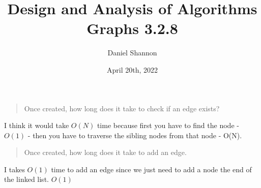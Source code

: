 \documentclass[12pt, letterpaper, twoside]{article}
\title{%
Design and Analysis of Algorithms\\
\large Graphs 3.2.8
}
\author{Daniel Shannon}
\date{April 20th, 2022}
\begin{document}
\begin{titlepage}
\maketitle
\end{titlepage}
\begin{quote}
Once created, how long does it take to check if an edge exists?
\end{quote}
I think it would take $O(N)$ time because first you have to find the node - $O(1)$ - then you have to traverse the sibling nodes from that node - O(N).
\begin{quote}
    Once created, how long does it take to add an edge.
\end{quote}
I takes $O(1)$ time to add an edge since we just need to add a node the end of the linked list.
$O(1)$
\end{document}
